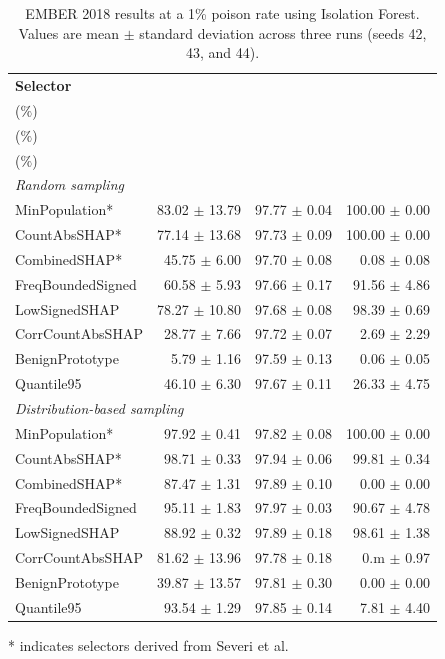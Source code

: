 \begin{table}[!t]
    \centering
    \caption{EMBER 2018 results at a 1\% poison rate using Isolation Forest. Values are mean $\pm$ standard deviation across three runs (seeds 42, 43, and 44).}
    \label{tab:ember2018_1p_if_3seeds}
    \setlength{\tabcolsep}{3.0pt}
    \renewcommand{\arraystretch}{1.08}
    \begin{tabular}{lrrr}
        \toprule
        \textbf{Selector} &
        \makecell{\textbf{ASR}\\($\%$)} &
        \makecell{\textbf{Clean accuracy}\\($\%$)} &
        \makecell{\textbf{Poison recall}\\($\%$)} \\
        \midrule
        \multicolumn{4}{l}{\textit{Random sampling}} \\
        MinPopulation*       & 83.02 $\pm$ 13.79 & 97.77 $\pm$ 0.04 & 100.00 $\pm$ 0.00 \\
        CountAbsSHAP*        & 77.14 $\pm$ 13.68 & 97.73 $\pm$ 0.09 & 100.00 $\pm$ 0.00 \\
        CombinedSHAP*        & 45.75 $\pm$ 6.00 & 97.70 $\pm$ 0.08 & 0.08 $\pm$ 0.08 \\
        FreqBoundedSigned    & 60.58 $\pm$ 5.93 & 97.66 $\pm$ 0.17 & 91.56 $\pm$ 4.86 \\
        LowSignedSHAP        & 78.27 $\pm$ 10.80 & 97.68 $\pm$ 0.08 & 98.39 $\pm$ 0.69 \\
        CorrCountAbsSHAP     & 28.77 $\pm$ 7.66 & 97.72 $\pm$ 0.07 & 2.69 $\pm$ 2.29 \\
        BenignPrototype      & 5.79 $\pm$ 1.16 & 97.59 $\pm$ 0.13 & 0.06 $\pm$ 0.05 \\
        Quantile95           & 46.10 $\pm$ 6.30 & 97.67 $\pm$ 0.11 & 26.33 $\pm$ 4.75 \\
        \midrule
        \multicolumn{4}{l}{\textit{Distribution-based sampling}} \\
        MinPopulation*       & 97.92 $\pm$ 0.41 & 97.82 $\pm$ 0.08 & 100.00 $\pm$ 0.00 \\
        CountAbsSHAP*        & 98.71 $\pm$ 0.33 & 97.94 $\pm$ 0.06 & 99.81 $\pm$ 0.34 \\
        CombinedSHAP*        & 87.47 $\pm$ 1.31 & 97.89 $\pm$ 0.10 & 0.00 $\pm$ 0.00 \\
        FreqBoundedSigned    & 95.11 $\pm$ 1.83 & 97.97 $\pm$ 0.03 & 90.67 $\pm$ 4.78 \\
        LowSignedSHAP        & 88.92 $\pm$ 0.32 & 97.89 $\pm$ 0.18 & 98.61 $\pm$ 1.38 \\
        CorrCountAbsSHAP     & 81.62 $\pm$ 13.96 & 97.78 $\pm$ 0.18 & 0.m $\pm$ 0.97 \\
        BenignPrototype      & 39.87 $\pm$ 13.57 & 97.81 $\pm$ 0.30 & 0.00 $\pm$ 0.00 \\
        Quantile95           & 93.54 $\pm$ 1.29 & 97.85 $\pm$ 0.14 & 7.81 $\pm$ 4.40 \\
        \bottomrule
    \end{tabular}
    \vspace{0.5mm}
    \raggedright
    * indicates selectors derived from Severi et al.
\end{table}
